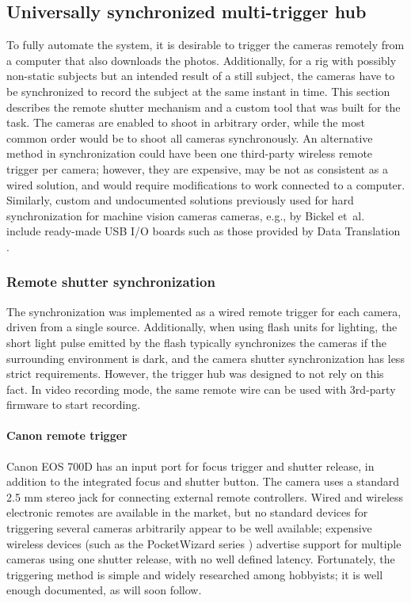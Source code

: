 
\subsection{Universally synchronized multi-trigger hub} %

To fully automate the system, it is desirable to trigger the cameras remotely from a computer that also downloads the photos.
Additionally, for a rig with possibly non-static subjects but an intended result of a still subject, the cameras have to be synchronized to record the subject at the same instant in time.
This section describes the remote shutter mechanism and a custom tool that was built for the task.
The cameras are enabled to shoot in arbitrary order, while the most common order would be to shoot all cameras synchronously.
An alternative method in synchronization could have been one third-party wireless remote trigger per camera;
however, they are expensive, may be not as consistent as a wired solution, and would require modifications to work connected to a computer.
Similarly, custom and undocumented solutions previously used for hard synchronization for machine vision cameras cameras, e.g., by Bickel et~al.\ \cite{bickel2007multi} include ready-made USB I/O boards such as those provided by Data Translation \cite{datatranslation}.

\subsubsection{Remote shutter synchronization} %

The synchronization was implemented as a wired remote trigger for each camera, driven from a single source.
Additionally, when using flash units for lighting, the short light pulse emitted by the flash typically synchronizes the cameras if the surrounding environment is dark, and the camera shutter synchronization has less strict requirements.
However, the trigger hub was designed to not rely on this fact.
In video recording mode, the same remote wire can be used with 3rd-party firmware to start recording.

\paragraph{Canon remote trigger}

Canon EOS 700D has an input port for focus trigger and shutter release, in addition to the integrated focus and shutter button.
The camera uses a standard 2.5 mm stereo jack for connecting external remote controllers.
Wired and wireless electronic remotes are available in the market, but no standard devices for triggering several cameras arbitrarily appear to be well available; expensive wireless devices (such as the PocketWizard series \cite{pocketwizard}) advertise support for multiple cameras using one shutter release, with no well defined latency.
Fortunately, the triggering method is simple and widely researched among hobbyists; it is well enough documented, as will soon follow.

